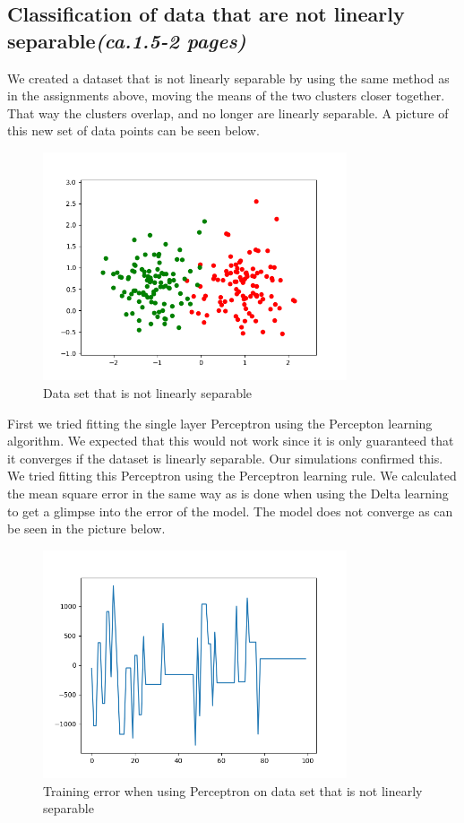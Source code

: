 \documentclass[a4paper]{article}
\begin{document}
\subsection{Classification of data that are not linearly separable\textit{(ca.1.5-2 pages)}}
We created a dataset that is not linearly separable by using the same method as in the assignments above, moving the means of the two clusters closer together. That way the clusters overlap, and no longer are linearly separable. A picture of this new set of data points can be seen below.
\begin{figure}[htb]
    \centering
    \includegraphics[width=0.8\textwidth]{Labs/Lab 1/Lab 1a/Results/overlapping_dataset.png}
    \caption{Data set that is not linearly separable}
    \label{fig:enter-label}
\end{figure}
First we tried fitting the single layer Perceptron using the Percepton learning algorithm. We expected that this would not work since it is only guaranteed that it converges if the dataset is linearly separable. Our simulations confirmed this. We tried fitting this Perceptron using the Perceptron learning rule. We calculated the mean square error in the same way as is done when using the Delta learning to get a glimpse into the error of the model. The model does not converge as can be seen in the picture below.

\begin{figure}[htb]
    \centering
    \includegraphics[width=0.8\textwidth]{Labs/Lab 1/Lab 1a/Results/perceptron-training-error-convergence.png}
    \caption{Training error when using Perceptron on data set that is not linearly separable}
    \label{fig:Perceptron-training-error}
\end{figure}
\end{document}
